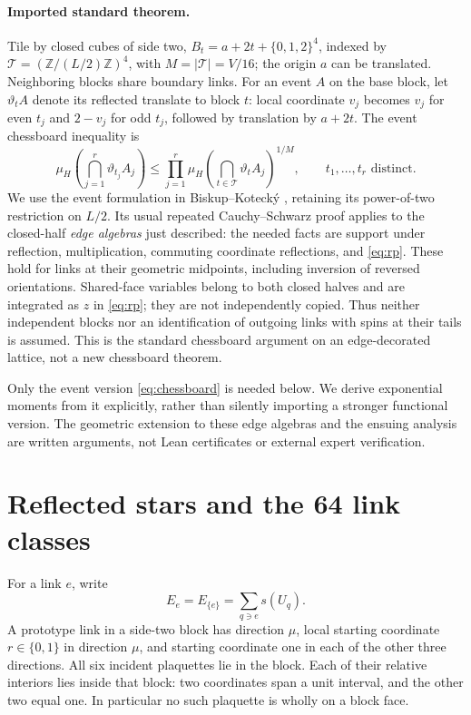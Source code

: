 \documentclass[11pt]{article}
\theoremstyle{remark}
\begin{document}
\paragraph{Imported standard theorem.}
Tile by closed cubes of side two,
$B_t=a+2t+\{0,1,2\}^4$, indexed by
$\mathcal T=(\mathbb Z/(L/2)\mathbb Z)^4$, with
$M=|\mathcal T|=V/16$; the origin $a$ can be translated.
Neighboring blocks share boundary links. For an event $A$ on the base
block, let $\vartheta_t A$ denote its reflected translate to block $t$:
local coordinate $v_j$ becomes $v_j$ for even $t_j$ and $2-v_j$ for odd
$t_j$, followed by translation by $a+2t$.
The event chessboard inequality is
\begin{equation}
 \mu_H\!\left(\bigcap_{j=1}^r\vartheta_{t_j}A_j\right)
 \le\prod_{j=1}^r
 \mu_H\!\left(\bigcap_{t\in\mathcal T}\vartheta_t A_j\right)^{1/M},
 \qquad t_1,\ldots,t_r\text{ distinct}.
 \label{eq:chessboard}
\end{equation}
We use the event formulation in Biskup--Koteck\'y
\cite[\S2.2, Theorem 2.4, (2.10)]{bk}, retaining its power-of-two
restriction on $L/2$. Its usual repeated Cauchy--Schwarz proof applies to
the closed-half \emph{edge algebras} just described: the needed facts are
support under reflection, multiplication, commuting coordinate
reflections, and \eqref{eq:rp}. These hold for links at their geometric
midpoints, including inversion of reversed orientations. Shared-face
variables belong to both closed halves and are integrated as $z$ in
\eqref{eq:rp}; they are not independently copied. Thus neither independent
blocks nor an identification of outgoing links with spins at their tails
is assumed. This is the standard chessboard argument on an edge-decorated
lattice, not a new chessboard theorem.

Only the event version \eqref{eq:chessboard} is needed below. We derive
exponential moments from it explicitly, rather than silently importing a
stronger functional version. The geometric extension to these edge
algebras and the ensuing analysis are written arguments, not Lean
certificates or external expert verification.

\section{Reflected stars and the 64 link classes}
For a link $e$, write
\[
 E_e=E_{\{e\}}=\sum_{q\ni e}s(U_q).
\]
A prototype link in a side-two block has direction $\mu$, local starting
coordinate $r\in\{0,1\}$ in direction $\mu$, and starting coordinate one
in each of the other three directions. All six incident plaquettes lie
in the block. Each of their relative interiors lies inside that block:
two coordinates span a unit interval, and the other two equal one.
In particular no such plaquette is wholly on a block face.
\end{document}
